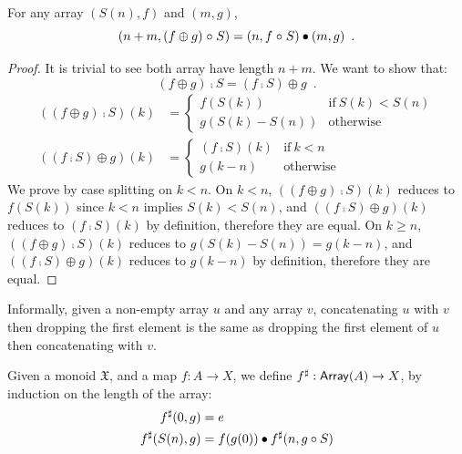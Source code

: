 \begin{lemmarep}
    \label{array:split}
    For any array $(S(n), f)$ and $(m, g)$,
    \[
        (n + m, (f \oplus g) \mathrel{\circ} S) = (n, f \mathrel{\circ} S) \mathbin{\bullet} (m, g)
        \enspace .
    \]
\end{lemmarep}
%
\begin{proof}
    It is trivial to see both array have length $n + m$.
    We want to show that:
    \[
        (f \oplus g) \comp S = (f \comp S) \oplus g \enspace.
    \]
    \begin{align*}
        ((f \oplus g) \comp S)(k) & = \begin{cases}
                                          f(S(k))        & \text{if}\ S(k) < S(n) \\
                                          g(S(k) - S(n)) & \text{otherwise}
                                      \end{cases} \\
        ((f \comp S) \oplus g)(k) & = \begin{cases}
                                          (f \comp S)(k) & \text{if}\ k < n \\
                                          g(k - n)       & \text{otherwise}
                                      \end{cases}
    \end{align*}
    We prove by case splitting on $k < n$.
    On $k < n$, $((f \oplus g) \comp S)(k)$ reduces to $f(S(k))$ since $k < n$ implies $S(k) < S(n)$,
    and $((f \comp S) \oplus g)(k)$ reduces to $(f \comp S)(k)$ by definition, therefore they are equal.
    On $k \geq n$, $((f \oplus g) \comp S)(k)$ reduces to $g(S(k) - S(n)) = g(k - n)$,
    and $((f \comp S) \oplus g)(k)$ reduces to $g(k - n)$ by definition, therefore they are equal.
\end{proof}
%
\begin{toappendix}
    Informally, given a non-empty array $u$ and any array $v$,
    concatenating $u$ with $v$ then dropping the first element is the same as
    dropping the first element of $u$ then concatenating with $v$.
\end{toappendix}
%
\begin{definition}
    Given a monoid $\mathfrak{X}$, and a map $f : A \to X$,
    we define ${f}^{\sharp} : \operatorname{\mathsf{Array}}(A) \to X$, by induction on the length of the array:
    \begin{align*}
        {f}^{\sharp}(0 , g)    & = e                                    \\
        {f}^{\sharp}(S(n) , g) & = f(g(0)) \mathbin{\bullet} {f}^{\sharp}(n , g \circ S)
    \end{align*}
\end{definition}
